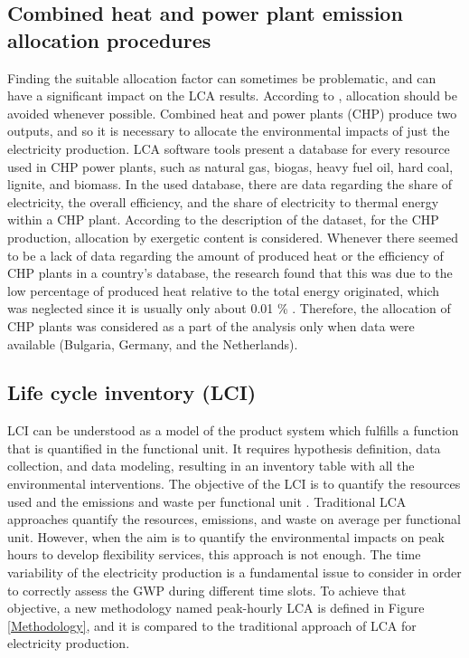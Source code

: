{\subsection*{Combined heat and power plant emission allocation procedures}
Finding the suitable allocation factor can sometimes be problematic, and can have a significant impact on the LCA results. According to \cite{2006ISOGuidelines}, allocation should be avoided whenever possible. Combined heat and power plants (CHP) produce two outputs, and so it is necessary to allocate the environmental impacts of just the electricity production. LCA software tools present a database for every resource used in CHP power plants, such as natural gas, biogas, heavy fuel oil, hard coal, lignite, and biomass. In the used database, there are data regarding the share of electricity, the overall efficiency, and the share of electricity to thermal energy within a CHP plant. According to the description of the dataset, for the CHP production, allocation by exergetic content is considered. Whenever there seemed to be a lack of data regarding the amount of produced heat or the efficiency of CHP plants in a country's database, the research found that this was due to the low percentage of produced heat relative to the total energy originated, which was neglected since it is usually only about 0.01 \% \cite{PEInternational2014GaBiV6}. Therefore, the allocation of CHP plants was considered as a part of the analysis only when data were available (Bulgaria, Germany, and the Netherlands).



\subsection{Life cycle inventory (LCI)} \label{LCI}


{LCI can be understood as a model of the product system which fulfills a function that is quantified in the functional unit. It requires hypothesis definition, data collection, and data modeling, resulting in an inventory table with all the environmental interventions. The objective of the LCI is to quantify the resources used and the emissions and waste per functional unit \cite{REBITZER2004701}. Traditional LCA approaches quantify the resources, emissions, and waste on average per functional unit. However, when the aim is to quantify the environmental impacts on peak hours to develop flexibility services, this approach is not enough. The time variability of the electricity production is a fundamental issue to consider in order to correctly assess the GWP during different time slots. To achieve that objective, a new methodology named peak-hourly LCA is defined in Figure \ref{Methodology}, and it is compared to the traditional approach of LCA for electricity production.}


}
